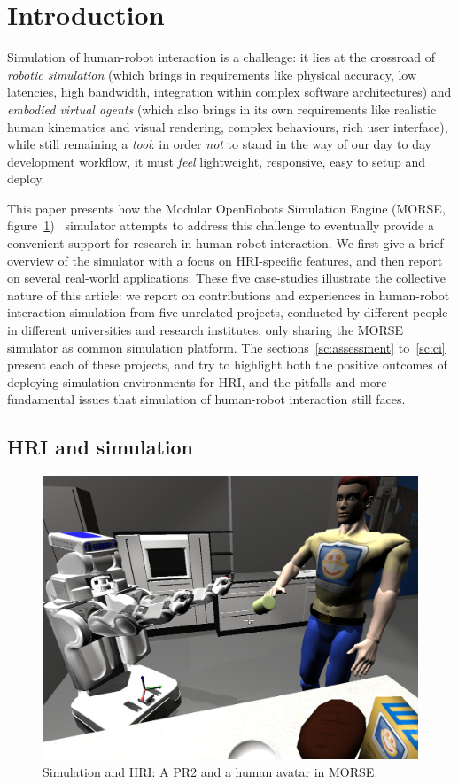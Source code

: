 \documentclass[conference]{IEEEtran}
\begin{document}
\IEEEpeerreviewmaketitle

\section{Introduction}

Simulation of human-robot interaction is a challenge: it lies at the crossroad
of \emph{robotic simulation} (which brings in requirements like physical
accuracy, low latencies, high bandwidth, integration within complex software
architectures) and \emph{embodied virtual agents} (which also brings in its own
requirements like realistic human kinematics and visual rendering, complex
behaviours, rich user interface), while still remaining a \emph{tool}: in order
\emph{not} to stand in the way of our day to day development workflow, it must
\emph{feel} lightweight, responsive, easy to setup and deploy.

This paper presents how the Modular OpenRobots Simulation Engine (MORSE,
figure~\ref{fig|morse-hri})~\cite{morse_simpar_2012} simulator attempts to
address this challenge to eventually provide a convenient support for research
in human-robot interaction.  We first give a brief overview of the simulator
with a focus on HRI-specific features, and then report on several real-world
applications. These five case-studies illustrate the collective nature of this
article: we report on contributions and experiences in human-robot interaction
simulation from five unrelated projects, conducted by different people in
different universities and research institutes, only sharing the MORSE simulator
as common simulation platform. The sections~\ref{sc:assessment} to~\ref{sc:ci}
present each of these projects, and try to highlight both the positive
outcomes of deploying simulation environments for HRI, and the pitfalls and more
fundamental issues that simulation of human-robot interaction still faces.

\subsection*{HRI and simulation}

\begin{figure}[ht!]
      \centering 
      \includegraphics[width=0.9\linewidth]{morse_pr2.jpg}
      \caption{Simulation and HRI: A PR2 and a human avatar in MORSE.}
      \label{fig|morse-hri}
\end{figure}
\end{document}
